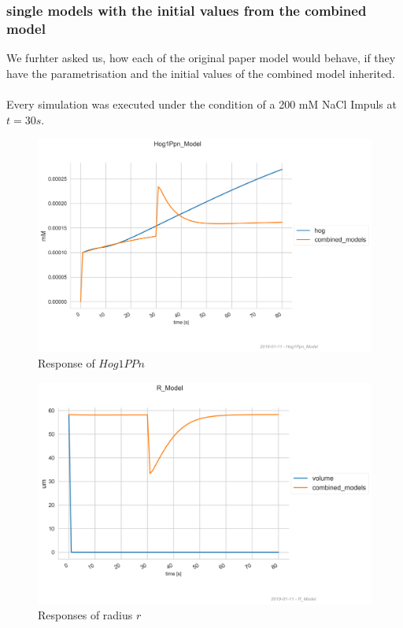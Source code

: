 \subsubsection{single models with the initial values from the combined model}
We furhter asked us, how each of the original paper model would behave, if they have the parametrisation and the initial values of the combined model inherited.\\\\
Every simulation was executed under the condition of a 200 mM NaCl Impuls at $t=30s$.\\
\begin{figure}[h!]
	\begin{center}
		\begin{minipage}{0,8\textwidth}
			
			\includegraphics[width=\textwidth]{picture/Hog1PPn_11.png}
			\caption{Response of $Hog1PPn$} 
			\label{CombiInitHog} 
		\end{minipage}
	\end{center}
\end{figure}
\begin{figure}[h!]
	\begin{center}
		\begin{minipage}{0,8\textwidth}
			
			\includegraphics[width=\textwidth]{picture/r_11.png}
			\caption{Responses of radius $r$} 
			\label{CombiInitVolume} 
		\end{minipage}
	\end{center}
\end{figure}
